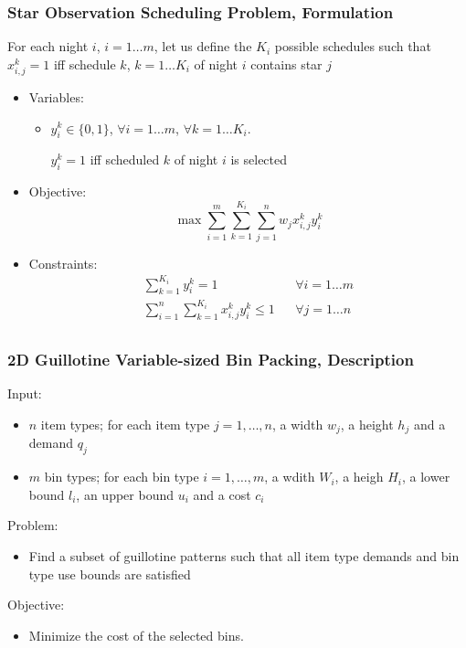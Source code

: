 \documentclass[10pt]{beamer}
\begin{document}
\begin{frame}
  \frametitle{Star Observation Scheduling Problem, Formulation}

  For each night $i$, $i = 1 \dots m$, let us define the $K_i$ possible schedules such that $x_{i, j}^k = 1$ iff schedule $k$, $k = 1 \dots K_i$ of night $i$ contains star $j$

  \begin{itemize}
    \item Variables:
      \begin{itemize}
        \item $y_i^k \in \{0, 1\}$,
          $\forall i = 1 \dots m$, $\forall k = 1 \dots K_i$.

          $y_i^k = 1$ iff scheduled $k$ of night $i$ is selected
      \end{itemize}

    \item Objective:
      \begin{displaymath}
        \max \sum_{i = 1}^m \sum_{k = 1}^{K_i} \sum_{j = 1}^n w_j x_{i, j}^k y_i^k
      \end{displaymath}

    \item Constraints:
      \begin{align*}
        \sum_{k = 1}^{K_i} y_i^k = 1 && \forall i = 1 \dots m \\
        \sum_{i = 1}^n \sum_{k = 1}^{K_i} x_{i, j}^k y_i^k \le 1 && \forall j = 1 \dots n \\
      \end{align*}
  \end{itemize}
\end{frame}

\begin{frame}
  \frametitle{2D Guillotine Variable-sized Bin Packing, Description}

  Input:
  \begin{itemize}
    \item $n$ item types; for each item type $j = 1, \dots, n$, a width \alert{$w_j$}, a height \alert{$h_j$} and a demand \alert{$q_j$}
    \item $m$ bin types; for each bin type $i = 1, \dots, m$, a wdith \alert{$W_i$}, a heigh \alert{$H_i$}, a lower bound \alert{$l_i$}, an upper bound \alert{$u_i$} and a cost \alert{$c_i$}
  \end{itemize}

  Problem:
  \begin{itemize}
    \item Find a subset of guillotine patterns such that all item type demands and bin type use bounds are satisfied
  \end{itemize}

  Objective:
  \begin{itemize}
    \item Minimize the cost of the selected bins.
  \end{itemize}
\end{frame}
\end{document}
